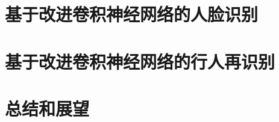 \documentclass[bachelor,zhspacing]{cqu}  %
\begin{document}
\section{基于改进卷积神经网络的人脸识别}\label{ux57faux4e8eux6539ux8fdbux5377ux79efux795eux7ecfux7f51ux7edcux7684ux4ebaux8138ux8bc6ux522b}

\section{基于改进卷积神经网络的行人再识别}\label{ux57faux4e8eux6539ux8fdbux5377ux79efux795eux7ecfux7f51ux7edcux7684ux884cux4ebaux518dux8bc6ux522b}

\section*{总结和展望}\label{ux603bux7ed3ux548cux5c55ux671b}

\hypertarget{refs}{}

%




\end{document}
